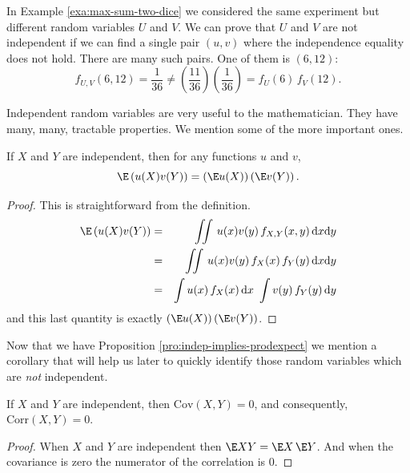 \documentclass[captions=tableheading]{scrbook}
\begin{document}
\begin{example}
In Example \ref{exa:max-sum-two-dice} we considered the same experiment but different random variables \(U\) and \(V\). We can prove that \(U\) and \(V\) are not independent if we can find a single pair \((u,v)\) where the independence equality does not hold. There are many such pairs. One of them is \((6,12)\):
\[
f_{U,V}(6,12)=\frac{1}{36}\neq\left(\frac{11}{36}\right)\left(\frac{1}{36}\right)=f_{U}(6)\, f_{V}(12).
\]
\end{example}
Independent random variables are very useful to the mathematician. They have many, many, tractable properties. We mention some of the more important ones.

\begin{prop}
\label{pro:indep-implies-prodexpect}
If \(X\) and \(Y\) are independent, then for any functions \(u\) and \(v\), 
\begin{equation}
\E\left(u(X)v(Y)\right)=\left(\E u(X)\right)\left(\E v(Y)\right).
\end{equation}
\end{prop}

\begin{proof}
This is straightforward from the definition.
\begin{eqnarray*}
\E\left(u(X)v(Y)\right) & = & \iint\, u(x)v(y)\, f_{X,Y}(x,y)\,\mathrm{d} x\mathrm{d} y\\
 & = & \iint\, u(x)v(y)\, f_{X}(x)\, f_{Y}(y)\,\mathrm{d} x\mathrm{d} y\\
 & = & \int u(x)\, f_{X}(x)\,\mathrm{d} x\ \int v(y)\, f_{Y}(y)\,\mathrm{d} y
\end{eqnarray*}
and this last quantity is exactly \(\left(\E u(X)\right)\left(\E v(Y)\right)\). 
\end{proof}

Now that we have Proposition \ref{pro:indep-implies-prodexpect} we mention a corollary that will help us later to quickly identify those random variables which are \emph{not} independent.

\begin{cor}
If \(X\) and \(Y\) are independent, then \(\mbox{Cov}(X,Y)=0\), and consequently,
\(\mbox{Corr}(X,Y)=0\).\label{cor:indep-implies-uncorr}
\end{cor}

\begin{proof}
When \(X\) and \(Y\) are independent then \(\E XY=\E X\,\E Y\). And when the covariance is zero the numerator of the correlation is 0.
\end{proof}
\end{document}
